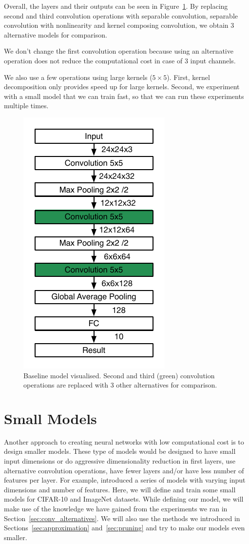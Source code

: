 Overall, the layers and their outputs can be seen in Figure~\ref{fig:baseline_model}. By replacing second and third convolution operations with separable convolution, separable convolution with nonlinearity and kernel composing convolution, we obtain 3 alternative models for comparison.

We don't change the first convolution operation because using an alternative operation does not reduce the computational cost in case of $3$ input channels.

We also use a few operations using large kernels ($5\times 5$). First, kernel decomposition only provides speed up for large kernels. Second, we experiment with a small model that we can train fast, so that we can run these experiments multiple times.
\begin{figure}[!h]
  \begin{centering}
    \includegraphics[width=.3\textwidth]{images/baseline_model.pdf}
    \caption{Baseline model visualised. Second and third (green) convolution operations are replaced with 3 other alternatives for comparison.}
    \label{fig:baseline_model}
  \end{centering}
\end{figure}

\section{Small Models}
Another approach to creating neural networks with low computational cost is to design smaller models. These type of models would be designed to have small input dimensions or do aggressive dimensionality reduction in first layers, use alternative convolution operations, have fewer layers and/or have less number of features per layer. For example, \cite{howard2017mobilenets} introduced a series of models with varying input dimensions and number of features. Here, we will define and train some small models for CIFAR-10 and ImageNet datasets. While defining our model, we will make use of the knowledge we have gained from the experiments we ran in Section~\ref{sec:conv_alternatives}. We will also use the methods we introduced in Sections~\ref{sec:approximation} and~\ref{sec:pruning} and try to make our models even smaller.

